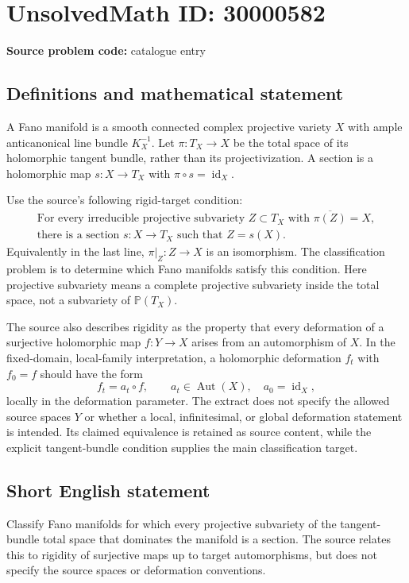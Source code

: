 \documentclass[11pt]{article}
\newcommand{\PP}{\mathbb{P}}
\begin{document}
\section*{UnsolvedMath ID: 30000582}
\textbf{Source problem code:} catalogue entry
\subsection{Definitions and mathematical statement}
A Fano manifold is a smooth connected complex projective variety $X$ with ample anticanonical line bundle $K_X^{-1}$. Let $\pi:T_X\to X$ be the total space of its holomorphic tangent bundle, rather than its projectivization. A section is a holomorphic map $s:X\to T_X$ with $\pi\circ s=\operatorname{id}_X$.

Use the source's following rigid-target condition:
\[
\begin{gathered}
\text{For every irreducible projective subvariety }Z\subset T_X
\text{ with }\overline{\pi(Z)}=X,\\
\text{there is a section }s:X\to T_X\text{ such that }Z=s(X).
\end{gathered}
\]
Equivalently in the last line, $\pi|_Z:Z\to X$ is an isomorphism. The classification problem is to determine which Fano manifolds satisfy this condition. Here projective subvariety means a complete projective subvariety inside the total space, not a subvariety of $\PP(T_X)$.

The source also describes rigidity as the property that every deformation of a surjective holomorphic map $f:Y\to X$ arises from an automorphism of $X$. In the fixed-domain, local-family interpretation, a holomorphic deformation $f_t$ with $f_0=f$ should have the form
\[
f_t=a_t\circ f,\qquad a_t\in\operatorname{Aut}(X),\quad a_0=\operatorname{id}_X,
\]
locally in the deformation parameter. The extract does not specify the allowed source spaces $Y$ or whether a local, infinitesimal, or global deformation statement is intended. Its claimed equivalence is retained as source content, while the explicit tangent-bundle condition supplies the main classification target.
\subsection{Short English statement}
Classify Fano manifolds for which every projective subvariety of the tangent-bundle total space that dominates the manifold is a section. The source relates this to rigidity of surjective maps up to target automorphisms, but does not specify the source spaces or deformation conventions.
\end{document}
